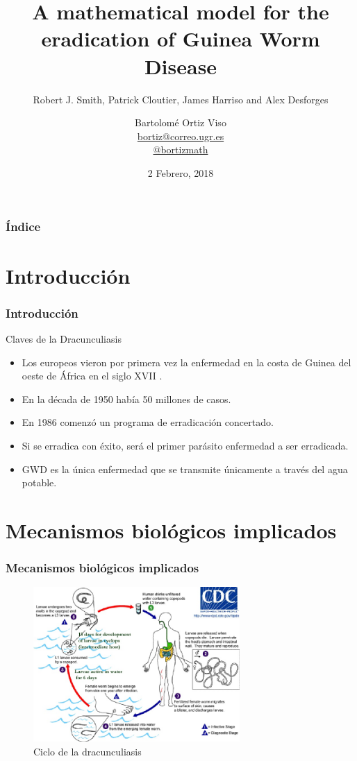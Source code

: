 \documentclass{beamer}
\title[Mathematical model of Guinea Worm Disease]{
  A mathematical model for the eradication of Guinea Worm Disease}
\subtitle{Robert J. Smith, Patrick Cloutier, James Harriso and Alex Desforges}
\author[Bartolomé Ortiz Viso]{
  Bartolomé Ortiz Viso \\\medskip
  {\small \url{bortiz@correo.ugr.es}} \\ 
  {\small \url{@bortizmath}}}
\institute[Universidad de Granada]{
  Modelos en Ecología  \\
  Máster en Física y Matemáticas}
\date[2 Febrero, 2018]{2 Febrero, 2018}
\begin{document}
\begin{frame}
  \titlepage
\end{frame}

\begin{frame}
  \frametitle{Índice}

  \tableofcontents
\end{frame}

\section{Introducción}

\begin{frame}
  \frametitle{Introducción}
		\begin{block}{Claves de la Dracunculiasis}
			\begin{itemize}
				\item Los europeos vieron por primera vez la enfermedad en la costa de Guinea del oeste de África en
				el siglo XVII .
				\item  En la década de 1950 había 50 millones de casos.
				\item  En 1986 comenzó un programa de erradicación concertado.
				\item  Si se erradica con éxito, será el primer parásito
				enfermedad a ser erradicada.
				\item  GWD es la única enfermedad que se transmite únicamente a través del agua potable.
			\end{itemize}
		\end{block}
\end{frame}

\section{Mecanismos biológicos implicados}

\begin{frame}
  \frametitle{Mecanismos biológicos implicados}
	\begin{figure}
		\centering
		\includegraphics[width=0.7\textwidth]{diagrama.jpg}
		\caption{Ciclo de la dracunculiasis }
		\label{fig:1}
	\end{figure}
\end{frame}
\end{document}

